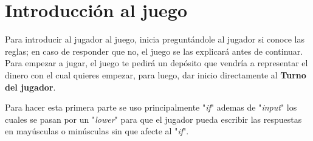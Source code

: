 \section{Introducción al juego}

Para introducir al jugador al juego, inicia preguntándole al jugador si conoce las reglas; en caso de responder que no, el juego se las explicará antes de continuar. Para empezar a jugar, el juego te pedirá un depósito que vendría a representar el dinero con el cual quieres empezar, para luego, dar inicio directamente al \textbf{Turno del jugador}.

Para hacer esta primera parte se uso principalmente "\textit{if}" ademas de "\textit{input}" los cuales se pasan por un "\textit{lower}" para que el jugador pueda escribir las respuestas en mayúsculas o minúsculas sin que afecte al "\textit{if}".